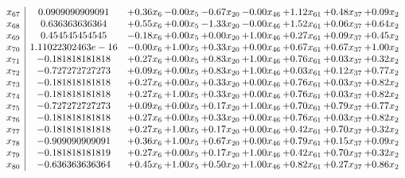 \documentclass[8pt]{article}
\begin{document}
\[\begin{array}{c| c c@{\hskip 2pt} c@{\hskip 2pt} c@{\hskip 2pt} c@{\hskip 2pt} c@{\hskip 2pt} c@{\hskip 2pt} c@{\hskip 2pt} }
 x_{67}   &  0.0909090909091 & +  0.36 x_{6} & -0.00 x_{5} & -0.67 x_{20} & -0.00 x_{46} & +  1.12 x_{61} & +  0.48 x_{37} & +  0.09 x_{2}\\
 x_{68}   &  0.636363636364 & +  0.55 x_{6} & +  0.00 x_{5} & -1.33 x_{20} & -0.00 x_{46} & +  1.52 x_{61} & +  0.06 x_{37} & +  0.64 x_{2}\\
 x_{69}   &  0.454545454545 & -0.18 x_{6} & +  0.00 x_{5} & +  0.00 x_{20} & +  1.00 x_{46} & +  0.27 x_{61} & +  0.09 x_{37} & +  0.45 x_{2}\\
 x_{70}   &  1.11022302463e-16 & -0.00 x_{6} & +  1.00 x_{5} & +  0.33 x_{20} & +  0.00 x_{46} & +  0.67 x_{61} & +  0.67 x_{37} & +  1.00 x_{2}\\
 x_{71}   &  -0.181818181818 & +  0.27 x_{6} & +  0.00 x_{5} & +  0.83 x_{20} & +  1.00 x_{46} & +  0.76 x_{61} & +  0.03 x_{37} & +  0.32 x_{2}\\
 x_{72}   &  -0.727272727273 & +  0.09 x_{6} & +  0.00 x_{5} & +  0.83 x_{20} & +  1.00 x_{46} & +  0.03 x_{61} & +  0.12 x_{37} & +  0.77 x_{2}\\
 x_{73}   &  -0.181818181818 & +  0.27 x_{6} & +  0.00 x_{5} & +  0.33 x_{20} & +  0.00 x_{46} & +  0.76 x_{61} & +  0.03 x_{37} & +  0.82 x_{2}\\
 x_{74}   &  -0.181818181818 & +  0.27 x_{6} & +  1.00 x_{5} & +  0.33 x_{20} & +  0.00 x_{46} & +  0.76 x_{61} & +  0.03 x_{37} & +  0.82 x_{2}\\
 x_{75}   &  -0.727272727273 & +  0.09 x_{6} & +  0.00 x_{5} & +  0.17 x_{20} & +  1.00 x_{46} & +  0.70 x_{61} & +  0.79 x_{37} & +  0.77 x_{2}\\
 x_{76}   &  -0.181818181818 & +  0.27 x_{6} & +  0.00 x_{5} & +  0.33 x_{20} & +  0.00 x_{46} & +  0.76 x_{61} & +  0.03 x_{37} & +  0.82 x_{2}\\
 x_{77}   &  -0.181818181818 & +  0.27 x_{6} & +  1.00 x_{5} & +  0.17 x_{20} & +  0.00 x_{46} & +  0.42 x_{61} & +  0.70 x_{37} & +  0.32 x_{2}\\
 x_{78}   &  -0.909090909091 & +  0.36 x_{6} & +  1.00 x_{5} & +  0.67 x_{20} & +  0.00 x_{46} & +  0.79 x_{61} & +  0.15 x_{37} & +  0.09 x_{2}\\
 x_{79}   &  -0.181818181819 & +  0.27 x_{6} & +  0.00 x_{5} & +  0.17 x_{20} & +  1.00 x_{46} & +  0.42 x_{61} & +  0.70 x_{37} & +  0.32 x_{2}\\
 x_{80}   &  -0.636363636364 & +  0.45 x_{6} & +  1.00 x_{5} & +  0.50 x_{20} & +  1.00 x_{46} & +  0.82 x_{61} & +  0.27 x_{37} & +  0.86 x_{2}\\

\end{array}\]
\end{document}
